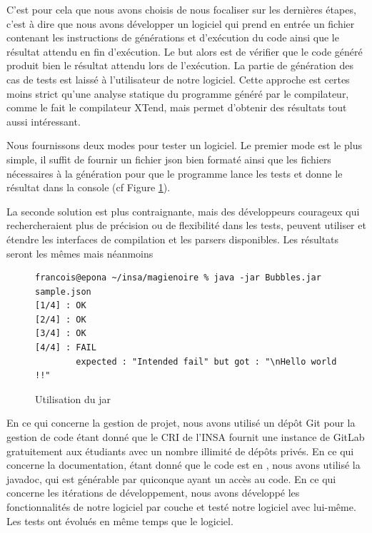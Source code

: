 C'est pour cela que nous avons choisis de nous focaliser sur les dernières étapes, c'est à dire que
nous avons développer un logiciel qui prend en entrée un fichier contenant les instructions de générations et d’exécution du code ainsi que le résultat
attendu en fin d’exécution. Le but alors est de vérifier que le code généré produit bien le résultat attendu lors de l’exécution. La partie de génération
des cas de tests est laissé à l'utilisateur de notre logiciel. Cette approche est certes moins strict qu'une analyse statique du programme généré par
le compilateur, comme le fait le compilateur XTend, mais permet d'obtenir des résultats tout aussi intéressant.

Nous fournissons deux modes pour tester un logiciel. Le premier mode est le plus simple, il suffit de fournir un fichier json bien formaté
ainsi que les fichiers nécessaires à la génération pour que le programme lance les tests et donne le résultat dans la console (cf Figure \ref{mode1}).

La seconde solution est plus contraignante, mais des développeurs courageux qui rechercheraient plus de précision ou de flexibilité dans les tests,
peuvent utiliser et étendre les interfaces de compilation et les parsers disponibles. Les résultats seront les mêmes mais néanmoins

\begin{figure}[!ht]
\begin{lstlisting}
francois@epona ~/insa/magienoire % java -jar Bubbles.jar sample.json
[1/4] : OK
[2/4] : OK
[3/4] : OK
[4/4] : FAIL
        expected : "Intended fail" but got : "\nHello world !!"
\end{lstlisting}
\caption{Utilisation du jar}
\label{mode1}
\end{figure}


En ce qui concerne la gestion de projet, nous avons utilisé un dépôt Git pour la gestion de code étant donné que le CRI de l'INSA fournit une
instance de GitLab gratuitement aux étudiants avec un nombre illimité de dépôts privés. En ce qui concerne la documentation, étant donné que le code
est en \jv, nous avons utilisé la javadoc, qui est générable par quiconque ayant un accès au code. En ce qui concerne les itérations de développement,
nous avons développé les fonctionnalités de notre logiciel par couche et testé notre logiciel avec lui-même. Les tests ont évolués en même temps que le logiciel.
